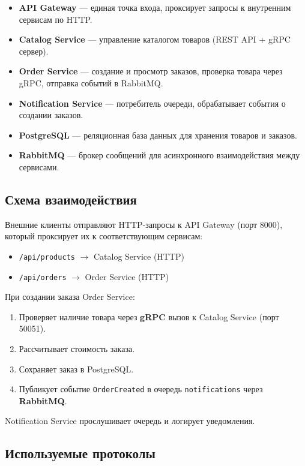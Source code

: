 \documentclass[14pt]{article}
\begin{document}
\begin{itemize}
    \item \textbf{API Gateway} --- единая точка входа, проксирует запросы к внутренним сервисам по HTTP.
    \item \textbf{Catalog Service} --- управление каталогом товаров (REST API + gRPC сервер).
    \item \textbf{Order Service} --- создание и просмотр заказов, проверка товара через gRPC, отправка событий в RabbitMQ.
    \item \textbf{Notification Service} --- потребитель очереди, обрабатывает события о создании заказов.
    \item \textbf{PostgreSQL} --- реляционная база данных для хранения товаров и заказов.
    \item \textbf{RabbitMQ} --- брокер сообщений для асинхронного взаимодействия между сервисами.
\end{itemize}

\subsection{Схема взаимодействия}

Внешние клиенты отправляют HTTP-запросы к API Gateway (порт 8000), который проксирует их к соответствующим сервисам:

\begin{itemize}
    \item \texttt{/api/products} $\rightarrow$ Catalog Service (HTTP)
    \item \texttt{/api/orders} $\rightarrow$ Order Service (HTTP)
\end{itemize}

При создании заказа Order Service:
\begin{enumerate}
    \item Проверяет наличие товара через \textbf{gRPC} вызов к Catalog Service (порт 50051).
    \item Рассчитывает стоимость заказа.
    \item Сохраняет заказ в PostgreSQL.
    \item Публикует событие \texttt{OrderCreated} в очередь \texttt{notifications} через \textbf{RabbitMQ}.
\end{enumerate}

Notification Service прослушивает очередь и логирует уведомления.

\subsection{Используемые протоколы}
\end{document}
